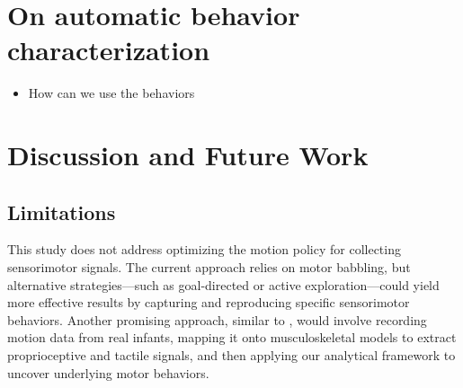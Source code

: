 \section{On automatic behavior characterization}
\begin{itemize}
    \item How can we use the behaviors 
\end{itemize}

\section{Discussion and Future Work}

\subsection{Limitations}
This study does not address optimizing the motion policy for collecting sensorimotor signals. The current approach relies on motor babbling, but alternative strategies---such as goal-directed or active exploration---could yield more effective results by capturing and reproducing specific sensorimotor behaviors. Another promising approach, similar to \cite{Kanazawa2023Openendedmovements}, would involve recording motion data from real infants, mapping it onto musculoskeletal models to extract proprioceptive and tactile signals, and then applying our analytical framework to uncover underlying motor behaviors.

